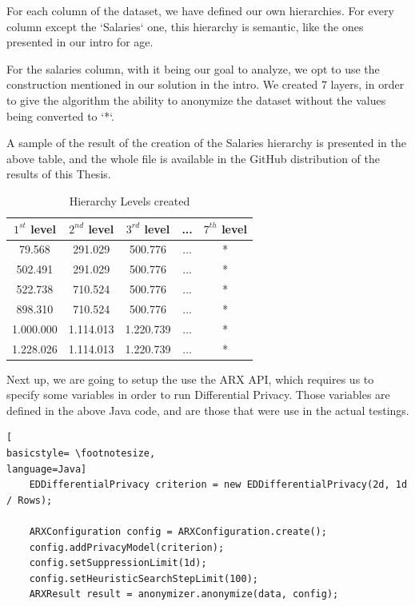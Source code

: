 For each column of the dataset, we have defined our own hierarchies. For every column except the `Salaries` one, this hierarchy is semantic, like the ones presented in our intro for age.

For the salaries column, with it being our goal to analyze, we opt to use the construction mentioned in our solution in the intro. We created 7 layers, in order to give the algorithm the ability to anonymize the dataset without the values being converted to `*`.

A sample of the result of the creation of the Salaries hierarchy is presented in the above table, and the whole file is available in the GitHub distribution of the results of this Thesis.

\begin{table}[!htb]
    \centering

    \caption{Hierarchy Levels created}
    \label{numbers}

    \begin{tabular}{| c | c | c | c | c|}
      \hline 
      $1^{st}$ level & $2^{nd}$ level & $3^{rd}$ level & ... & $7^{th}$ level \\
      \hline
        79.568  &	291.029 & 500.776 &   	... &	*\\
              \hline
        502.491 &	291.029 &	500.776 &... &	*\\
              \hline
        522.738 &	710.524 &	500.776 &...	&   *\\
              \hline
        898.310 &	710.524 &	500.776 &... &	*\\
              \hline
        1.000.000 &	1.114.013 &   1.220.739 &...&	*\\
              \hline
        1.228.026 &	1.114.013 &   1.220.739 &... &	*\\
              \hline
    \end{tabular}
\end{table}

Next up, we are going to setup the use the ARX API, which requires us to specify some variables in order to run Differential Privacy. Those variables are defined in the above Java code, and are those that were use in the actual testings.

\bigskip
\bigskip
\bigskip
\bigskip
\begin{lstlisting}[
basicstyle= \footnotesize,
language=Java]
    EDDifferentialPrivacy criterion = new EDDifferentialPrivacy(2d, 1d / Rows);

    ARXConfiguration config = ARXConfiguration.create();
    config.addPrivacyModel(criterion);
    config.setSuppressionLimit(1d);
    config.setHeuristicSearchStepLimit(100);
    ARXResult result = anonymizer.anonymize(data, config);
\end{lstlisting}
\bigskip


